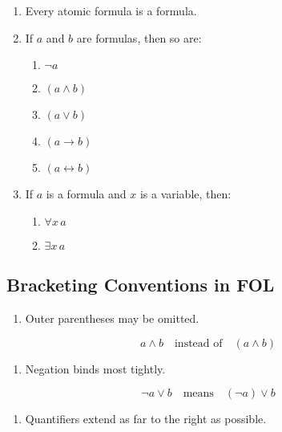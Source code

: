 \documentclass[12pt,a4paper,openany]{article}
\begin{document}
\begin{enumerate}
\def\labelenumi{\arabic{enumi}.}
\item
  Every atomic formula is a formula.
\item
  If \(a\) and \(b\) are formulas, then so are:

  \begin{enumerate}
  \def\labelenumii{\arabic{enumii}.}
  \item
    \(\lnot a\)
  \item
    \((a \land b)\)
  \item
    \((a \lor b)\)
  \item
    \((a \to b)\)
  \item
    \((a \leftrightarrow b)\)
  \end{enumerate}
\item
  If \(a\) is a formula and \(x\) is a variable, then:

  \begin{enumerate}
  \def\labelenumii{\arabic{enumii}.}
  \item
    \(\forall x \, a\)
  \item
    \(\exists x \, a\)
  \end{enumerate}
\end{enumerate}

\subsection{Bracketing Conventions in
FOL}\label{bracketing-conventions-in-fol}

\begin{enumerate}
\def\labelenumi{\arabic{enumi}.}

\item
  Outer parentheses may be omitted.
\end{enumerate}

\[
  a \land b \quad \text{instead of} \quad (a \land b)
  \]

\begin{enumerate}
\def\labelenumi{\arabic{enumi}.}
\setcounter{enumi}{1}

\item
  Negation binds most tightly.
\end{enumerate}

\[
  \lnot a \lor b \quad \text{means} \quad (\lnot a) \lor b
  \]

\begin{enumerate}
\def\labelenumi{\arabic{enumi}.}
\setcounter{enumi}{2}

\item
  Quantifiers extend as far to the right as possible.
\end{enumerate}
\end{document}
